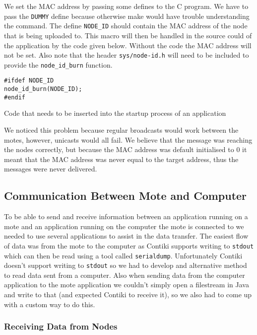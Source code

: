 We set the MAC address by passing some defines to the C program. We have to pass the \verb|DUMMY| define because otherwise make would have trouble understanding the command. The define \verb|NODE_ID| should contain the MAC address of the node that is being uploaded to. This macro will then be handled in the source could of the application by the code given below. Without the code the MAC address will not be set. Also note that the header \verb|sys/node-id.h| will need to be included to provide the \verb|node_id_burn| function.

\begin{listing} 
\begin{verbatim}
#ifdef NODE_ID
node_id_burn(NODE_ID);
#endif
\end{verbatim}
\caption{Code that needs to be inserted into the startup process of an application}
\end{listing}

We noticed this problem because regular broadcasts would work between the motes, however, unicasts would all fail. We believe that the message was reaching the nodes correctly, but because the MAC address was default initialised to 0 it meant that the MAC address was never equal to the target address, thus the messages were never delivered.


\subsection{Communication Between Mote and Computer}
To be able to send and receive information between an application running on a mote and an application running on the computer the mote is connected to we needed to use several applications to assist in the data transfer. The easiest flow of data was from the mote to the computer as Contiki supports writing to \verb|stdout| which can then be read using a tool called \verb|serialdump|. Unfortunately Contiki doesn't support writing to \verb|stdout| so we had to develop and alternative method to read data sent from a computer. Also when sending data from the computer application to the mote application we couldn't simply open a filestream in Java and write to that (and expected Contiki to receive it), so we also had to come up with a custom way to do this.

\subsubsection{Receiving Data from Nodes}

